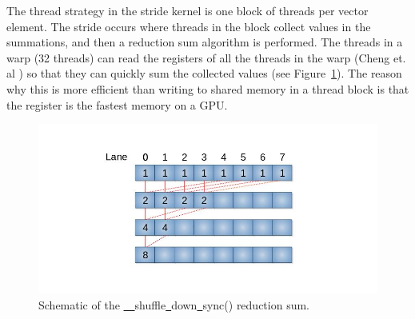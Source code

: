\documentclass{article}
\begin{document}
The thread strategy in the stride kernel is one block of threads per vector element. The stride occurs where threads in the block collect values in the summations, and then a reduction sum algorithm is performed. The threads in a warp (32 threads) can read the registers of all the threads in the warp (Cheng et. al \cite{Cheng2014}) so that they can quickly sum the collected values (see Figure~\ref{reducsum}). The reason why this is more efficient than writing to shared memory in a thread block is that the register is the fastest memory on a GPU. 
\begin{figure}[H]
\centering
  \includegraphics[width=.7\textwidth]{reduction.jpg}
  \caption{Schematic of the \underline{~}\underline{~}shuffle\underline{~}down\underline{~}sync() reduction sum.}
  \label{reducsum}
\end{figure}
\end{document}
